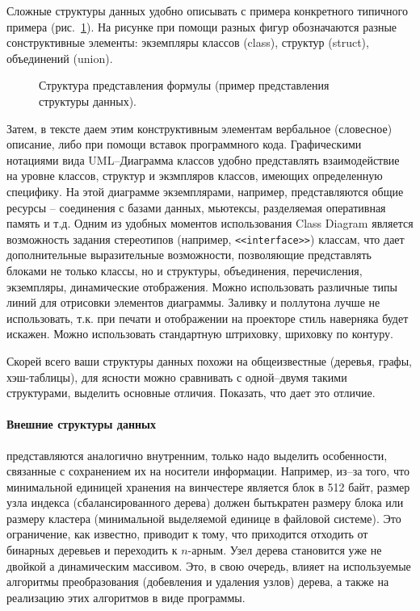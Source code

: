 \documentclass[a4paper,14pt,final]{extreport}
\begin{document}
Сложные структуры данных удобно описывать с примера конкретного типичного примера (рис.~\ref{fig:datastructex}).  На рисунке при помощи разных фигур обозначаются разные сонструктивные элементы: экземпляры классов (class), структур (struct), объединений (union).
\begin{figure}[hbt]
  \centering

  \caption[Пример структуры данных]{Структура представления формулы (пример представления структуры данных).}
  \label{fig:datastructex}
\end{figure}
Затем, в тексте даем этим конструктивным элементам вербальное (словесное) описание, либо при помощи вставок программного кода.  Графическими нотациями вида UML\;--\;Диаграмма классов удобно представлять взаимодействие на уровне классов, структур и экзмпляров классов, имеющих определенную специфику.  На этой диаграмме экземплярами, например, представляются общие ресурсы -- соединения с базами данных, мьютексы, разделяемая оперативная память и т.д.  Одним из удобных моментов использования Class Diagram является возможность задания стереотипов (например, \texttt{<<interface>>}) классам, что дает дополнительные выразительные возможности, позволяющие представлять блоками не только классы, но и структуры, объединения, перечисления, экземпляры, динамические отображения.  Можно использовать различные типы линий для отрисовки элементов диаграммы.  Заливку и поллутона лучше не использовать, т.к. при печати и отображении на проекторе стиль наверняка будет искажен.  Можно использовать стандартную штриховку, шриховку по контуру.

Скорей всего ваши структуры данных похожи на общеизвестные (деревья, графы, хэш-таблицы), для ясности можно сравнивать с одной--двумя такими структурами, выделить основные отличия.  Показать, что дает это отличие.


\paragraph{Внешние структуры данных} представляются аналогично внутренним, только надо выделить особенности, связанные с сохранением их на носители информации.  Например, из--за того, что минимальной единицей хранения на винчестере является блок в 512 байт, размер узла индекса (сбалансированного дерева) должен бытькратен размеру блока или размеру кластера (минимальной выделяемой единице в файловой системе).  Это ограничение, как известно, приводит к тому, что приходится отходить от бинарных деревьев и переходить к $n$-арным.  Узел дерева становится уже не двойкой а динамическим массивом.  Это, в свою очередь, влияет на используемые алгоритмы преобразования (добевления и удаления узлов) дерева, а также на реализацию этих алгоритмов в виде программы.
\end{document}
